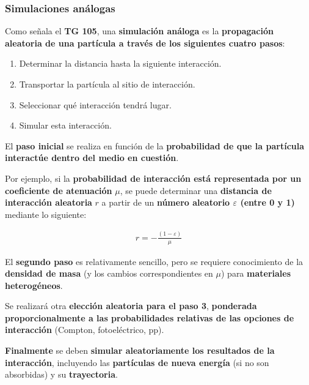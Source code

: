 \documentclass[aspectratio=169,xcolor=dvipsnames,t]{beamer}
\newcommand{\bae}{\begin{eqnarray}}
\newcommand{\eae}{\end{eqnarray}}
\begin{document}
\begin{frame}

    \frametitle{Simulaciones análogas}

    Como señala el \textbf{TG 105}, una \textbf{simulación análoga} es la \textbf{propagación aleatoria de una partícula a través de los siguientes cuatro pasos}:

    \begin{enumerate}
        \item Determinar la distancia hasta la siguiente interacción.
        \item Transportar la partícula al sitio de interacción.
        \item Seleccionar qué interacción tendrá lugar.
        \item Simular esta interacción.
    \end{enumerate}

    El \textbf{paso inicial} se realiza en función de la \textbf{probabilidad de que la partícula interactúe dentro del medio en cuestión}.

\end{frame}

\begin{frame}

    Por ejemplo, si la \textbf{probabilidad de interacción está representada por un coeficiente de atenuación} $\mu$, se puede determinar una \textbf{distancia de interacción aleatoria} $r$ a partir de un \textbf{número aleatorio $\varepsilon$ (entre 0 y 1)} mediante lo siguiente:

    \vspace{-0.2cm}

    \bae
    r=-\frac{(1-\varepsilon)}{\mu}
    \eae

    \vspace{-0.2cm}

    El \textbf{segundo paso }es relativamente sencillo, pero se requiere conocimiento de la \textbf{densidad de masa} (y los cambios correspondientes en $\mu$) para \textbf{materiales heterogéneos}. 
    
    Se realizará otra \textbf{elección aleatoria para el paso 3}, \textbf{ponderada proporcionalmente a las probabilidades relativas de las opciones de interacción} (Compton, fotoeléctrico, pp). 
    
    \textbf{Finalmente} se deben \textbf{simular aleatoriamente los resultados de la interacción}, incluyendo las \textbf{partículas de nueva energía} (si no son absorbidas) y su \textbf{trayectoria}.

\end{frame}
\end{document}
